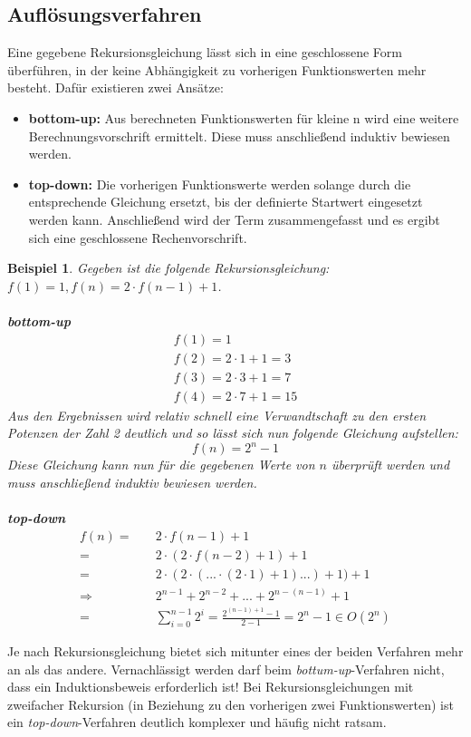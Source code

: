 \documentclass[11pt,a4paper]{scrartcl}
\newtheorem{example}{Beispiel}
\begin{document}
\subsection{Auflösungsverfahren}
Eine gegebene Rekursionsgleichung lässt sich in eine geschlossene Form überführen, in der keine Abhängigkeit zu vorherigen Funktionswerten mehr besteht. Dafür existieren zwei Ansätze: 
\begin{itemize}
\item \textbf{bottom-up:} Aus berechneten Funktionswerten für kleine n wird eine weitere Berechnungsvorschrift ermittelt. Diese muss anschließend induktiv bewiesen werden.
\item \textbf{top-down:} Die vorherigen Funktionswerte werden solange durch die entsprechende Gleichung ersetzt, bis der definierte Startwert eingesetzt werden kann. Anschließend wird der Term zusammengefasst und es ergibt sich eine geschlossene Rechenvorschrift. 
\end{itemize}
\begin{example}
Gegeben ist die folgende Rekursionsgleichung: $f(1) = 1, f(n) = 2 \cdot f(n-1) + 1$. \\\\
\textbf{bottom-up} \\
\begin{align}
f(1) = 1 \\
f(2) = 2 \cdot 1 + 1 = 3 \\
f(3) = 2 \cdot 3 + 1 = 7 \\
f(4) = 2 \cdot 7 + 1 = 15
\end{align}
Aus den Ergebnissen wird relativ schnell eine Verwandtschaft zu den ersten Potenzen der Zahl 2 deutlich und so lässt sich nun folgende Gleichung aufstellen: 
\[f(n) = 2^{n} - 1\]
Diese Gleichung kann nun für die gegebenen Werte von $n$ überprüft werden und muss anschließend induktiv bewiesen werden. \\\\
\textbf{top-down} \\
\begin{align}
f(n) =& \quad 2 \cdot f(n-1) + 1 \\
=& \quad 2 \cdot (2 \cdot f(n-2) + 1) + 1 \\
=& \quad 2 \cdot (2 \cdot (... \cdot (2 \cdot 1) + 1) ... ) + 1) + 1 \\
\Rightarrow & \quad 2^{n-1} + 2^{n-2} + ... + 2^{n-(n-1)} + 1 \\
=& \quad \sum_{i = 0}^{n-1} 2^{i} = \frac{2^{(n-1)+1}-1}{2-1} = 2^{n}-1 \in O(2^{n}) 
\end{align}
\end{example}
Je nach Rekursionsgleichung bietet sich mitunter eines der beiden Verfahren mehr an als das andere. Vernachlässigt werden darf beim \textit{bottum-up}-Verfahren nicht, dass ein Induktionsbeweis erforderlich ist! Bei Rekursionsgleichungen mit zweifacher Rekursion (in Beziehung zu den vorherigen zwei Funktionswerten) ist ein \textit{top-down}-Verfahren deutlich komplexer und häufig nicht ratsam.
\pagebreak
\end{document}
